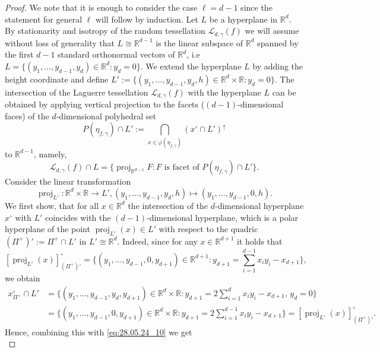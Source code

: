 \documentclass[11pt,a4paper]{article}
\theoremstyle{plain}
\theoremstyle{definition}
\theoremstyle{remark}
\def\RR{\mathbb{R}}
\def\cL{\mathcal{L}}
\newcommand{\proj}{\operatorname{proj}}
\begin{document}
\begin{proof}
    We note that it is enough to consider the case $\ell=d-1$ since the statement for general $\ell$ will follow by induction. Let $L$ be a hyperplane in $\RR^{d}$. By stationarity and isotropy of the random tessellation $\cL_{d,\gamma}(f)$ we will assume without loss of generality that $L\cong\RR^{d-1}$ is the linear subspace of $\RR^d$ spanned by the first $d-1$ standard orthonormal vectors of $\RR^d$, i.e $L = \{(y_1,\dots,y_{d-1},y_d) \in \RR^d: y_d=0\}$. We extend the hyperplane $L$ by adding the height coordinate and define $L' := \{(y_1,\dots,y_{d-1},y_d,h) \in \RR^d\times\RR: y_d=0\}$. The intersection of the Laguerre tessellation $\cL_{d,\gamma}(f)$ with the hyperplane $L$ can be obtained by applying vertical projection to the facets ($(d-1)$-dimensional faces) of the $d$-dimensional polyhedral set
    \begin{equation}\label{eq:28.05.24_10}
        P(\eta_{f,\gamma})\cap{L'}:=\bigcap_{x\in\varphi(\eta_{f,\gamma})}(x^\circ \cap L')^\uparrow
    \end{equation} 
    to $\RR^{d-1}$, namely,
    \begin{equation}\label{eq:28.05.24_11}
        \cL_{d,\gamma}(f)\cap L=\{\proj_{\RR^{d-1}} F\colon F\text{ is facet of }P(\eta_{f,\gamma})\cap{L'}\}.
    \end{equation}
    Consider the linear transformation 
    \[
        \proj_{L'}\colon \RR^d\times \RR \to L', (y_1,\dots,y_{d-1},y_d,h)\mapsto (y_1,\dots,y_{d-1},0,h).
    \]
    We first show, that for all $x\in\RR^d$ the intersection of the $d$-dimensional hyperplane $x^\circ$ with $L'$ coincides with the $(d-1)$-dimensional hyperplane, which is a polar hyperplane of the point $\proj_{L'}(x)\in L'$ with respect to the quadric $(\Pi^+)':=\Pi^+ \cap L'$ in $L'\cong \RR^d$. Indeed, since for any $x\in\RR^{d+1}$ it holds that
    \[
        [\proj_{L'}(x)]^\circ_{(\Pi^+)'}=\big\{(y_1,\dots,y_{d-1},0,y_{d+1})\in\RR^{d+1}:y_{d+1}=\sum_{i=1}^{d-1}x_iy_i-x_{d+1}\big\},
    \]
    we obtain
    \begin{align*}        
        x^\circ_{\Pi^+} \cap L' 
        &=\big\{(y_1,\dots,y_{d-1},y_d,y_{d+1})\in \RR^d\times\RR:y_{d+1}=2\sum_{i=1}^{d}x_i y_i - x_{d+1},\, y_d=0\big\}\\
        &=\big\{(y_1,\dots,y_{d-1},0,y_{d+1})\in \RR^d\times\RR:y_{d+1}=2\sum_{i=1}^{d-1}x_i y_i - x_{d+1}\big\}=[\proj_{L'}(x)]^\circ_{(\Pi^+)'}.
    \end{align*}
    Hence, combining this with \eqref{eq:28.05.24_10} we get
    \begin{equation}\label{eq:28.05.24_12}

\end{equation}
\end{proof}
\end{document}
